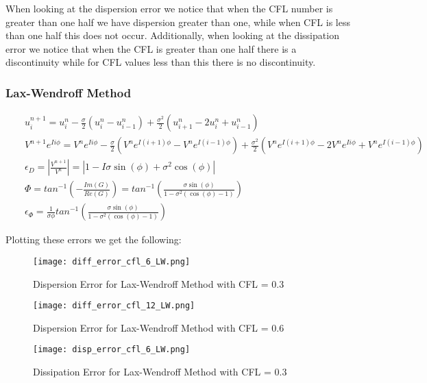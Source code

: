 \documentclass[a4paper,12pt,titlepage]{article}
\newcommand{\scale}{0.5}
\begin{document}
When looking at the dispersion error we notice that when the CFL number is greater than one half we have dispersion greater than one, while when CFL is less than one half this does not occur.  Additionally, when looking at the dissipation error we notice that when the CFL is greater than one half there is a discontinuity while for CFL values less than this there is no discontinuity.

\subsubsection{Lax-Wendroff Method}
\begin{eqnarray}
&&u_{i}^{n+1} = u_{i}^n - \frac{\sigma}{2} (u_i^n-u_{i-1}^n) + \frac{\sigma^2}{2}(u_{i+1}^n-2u_i^n+u_{i-1}^n)\nonumber \\
&&V^{n+1}e^{Ii\phi} = V^{n}e^{Ii\phi} - \frac{\sigma}{2}(V^{n}e^{I(i+1)\phi}-V^{n}e^{I(i-1)\phi})+\frac{\sigma^2}{2}(V^{n}e^{I(i+1)\phi}-2V^{n}e^{Ii\phi}+V^{n}e^{I(i-1)\phi})\nonumber \\
&& \boxed{\epsilon_{D} = \left|\frac{V^{n+1}}{V^n}\right| = \left|1-I\sigma \sin(\phi) + \sigma^2\cos(\phi) \right|} \nonumber \\
&&\Phi = tan^{-1}\left(-\frac{Im(G)}{Re(G)} \right) = tan^{-1}\left(\frac{\sigma \sin(\phi)}{1-\sigma^2(\cos(\phi)-1)} \right)\nonumber \\
&&\boxed{\epsilon_{\Phi} = \frac{1}{\sigma \phi} tan^{-1}\left(\frac{\sigma \sin(\phi)}{1-\sigma^2(\cos(\phi)-1)} \right)}
\end{eqnarray}

Plotting these errors we get the following:

\begin{figure}[H]
  \begin{center}
    \texttt{[image: diff\_error\_cfl\_6\_LW.png]}
    \caption{Dispersion Error for Lax-Wendroff Method with CFL = 0.3}
  \end{center}
\end{figure}

\begin{figure}[H]
  \begin{center}
    \texttt{[image: diff\_error\_cfl\_12\_LW.png]}
    \caption{Dispersion Error for Lax-Wendroff Method with CFL = 0.6}
  \end{center}
\end{figure}

\begin{figure}[H]
  \begin{center}
    \texttt{[image: disp\_error\_cfl\_6\_LW.png]}
    \caption{Dissipation Error for Lax-Wendroff Method with CFL = 0.3}
  \end{center}
\end{figure}
\end{document}
